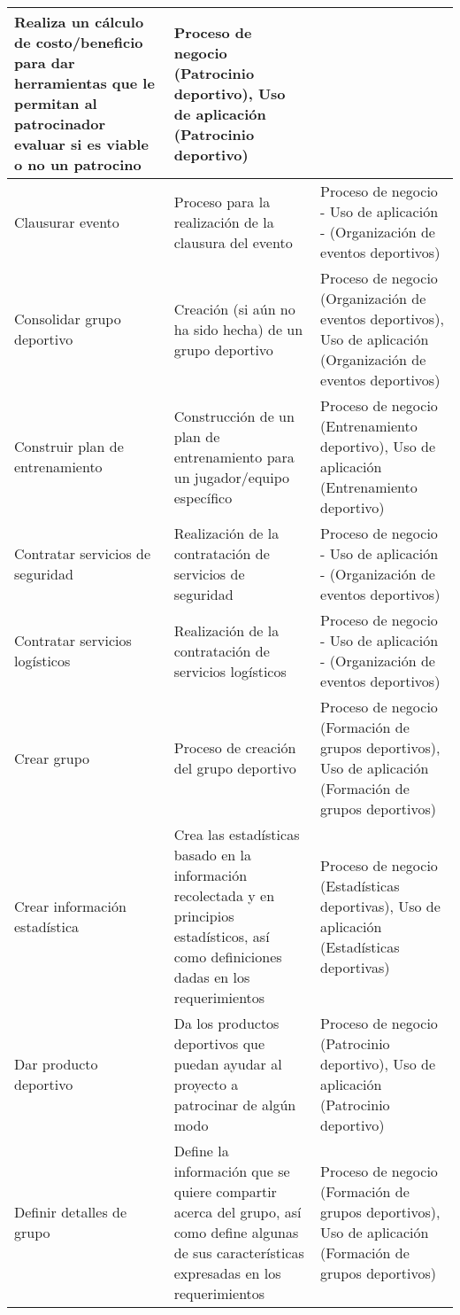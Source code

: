 \begin{center}
\begin{longtable}{|p{4cm}|p{7cm}|p{4cm}|}
		Realiza un cálculo de costo/beneficio para dar herramientas que le permitan al patrocinador evaluar si es viable o no un patrocino & 
		Proceso de negocio (Patrocinio deportivo), Uso de aplicación (Patrocinio deportivo)
		\\
		\hline
		Clausurar evento & 
		Proceso para la realización de la clausura del evento & 
		Proceso de negocio - Uso de aplicación - (Organización de eventos deportivos)
		\\
		\hline
		Consolidar grupo deportivo & 
		Creación (si aún no ha sido hecha) de un grupo deportivo & 
		Proceso de negocio (Organización de eventos deportivos), Uso de aplicación (Organización de eventos deportivos)
		\\
		\hline
		Construir plan de entrenamiento & 
		Construcción de un plan de entrenamiento para un jugador/equipo específico & 
		Proceso de negocio (Entrenamiento deportivo), Uso de aplicación (Entrenamiento deportivo)
		\\
		\hline
		Contratar servicios de seguridad & 
		Realización de la contratación de servicios de seguridad & 
		Proceso de negocio - Uso de aplicación - (Organización de eventos deportivos)
		\\
		\hline
		Contratar servicios logísticos & 
		Realización de la contratación de servicios logísticos & 
		Proceso de negocio - Uso de aplicación - (Organización de eventos deportivos)
		\\
		\hline
		Crear grupo & 
		Proceso de creación del grupo deportivo & 
		Proceso de negocio (Formación de grupos deportivos), Uso de aplicación (Formación de grupos deportivos)
		\\
		\hline
		Crear información estadística & 
		Crea las estadísticas basado en la información recolectada y en principios estadísticos, así como definiciones dadas en los requerimientos & 
		Proceso de negocio (Estadísticas deportivas), Uso de aplicación (Estadísticas deportivas)
		\\
		\hline
		Dar producto deportivo & 
		Da los productos deportivos que puedan ayudar al proyecto a patrocinar de algún modo & 
		Proceso de negocio (Patrocinio deportivo), Uso de aplicación (Patrocinio deportivo)
		\\
		\hline
		Definir detalles de grupo & 
		Define la información que se quiere compartir acerca del grupo, así como define algunas de sus características expresadas en los requerimientos & 
		Proceso de negocio (Formación de grupos deportivos), Uso de aplicación (Formación de grupos deportivos)
		\\

\end{longtable}
\end{center}
